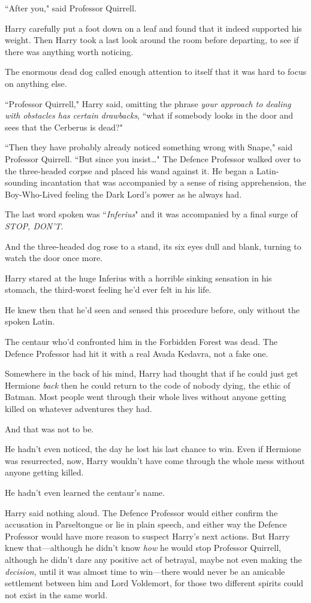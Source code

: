 ``After you," said Professor Quirrell.

Harry carefully put a foot down on a leaf and found that it indeed supported his weight. Then Harry took a last look around the room before departing, to see if there was anything worth noticing.

The enormous dead dog called enough attention to itself that it was hard to focus on anything else.

``Professor Quirrell," Harry said, omitting the phrase \emph{your approach to dealing with obstacles has certain drawbacks}, ``what if somebody looks in the door and sees that the Cerberus is dead?"

``Then they have probably already noticed something wrong with Snape," said Professor Quirrell. ``But since you insist…" The Defence Professor walked over to the three-headed corpse and placed his wand against it. He began a Latin-sounding incantation that was accompanied by a sense of rising apprehension, the Boy-Who-Lived feeling the Dark Lord's power as he always had.

The last word spoken was ``\emph{Inferius}" and it was accompanied by a final surge of \emph{STOP, DON'T}.

And the three-headed dog rose to a stand, its six eyes dull and blank, turning to watch the door once more.

Harry stared at the huge Inferius with a horrible sinking sensation in his stomach, the third-worst feeling he'd ever felt in his life.

He knew then that he'd seen and sensed this procedure before, only without the spoken Latin.

The centaur who'd confronted him in the Forbidden Forest was dead. The Defence Professor had hit it with a real Avada Kedavra, not a fake one.

Somewhere in the back of his mind, Harry had thought that if he could just get Hermione \emph{back} then he could return to the code of nobody dying, the ethic of Batman. Most people went through their whole lives without anyone getting killed on whatever adventures they had.

And that was not to be.

He hadn't even noticed, the day he lost his last chance to win. Even if Hermione was resurrected, now, Harry wouldn't have come through the whole mess without anyone getting killed.

He hadn't even learned the centaur's name.

Harry said nothing aloud. The Defence Professor would either confirm the accusation in Parseltongue or lie in plain speech, and either way the Defence Professor would have more reason to suspect Harry's next actions. But Harry knew that—although he didn't know \emph{how} he would stop Professor Quirrell, although he didn't dare any positive act of betrayal, maybe not even making the \emph{decision}, until it was almost time to win—there would never be an amicable settlement between him and Lord Voldemort, for those two different spirits could not exist in the same world.

